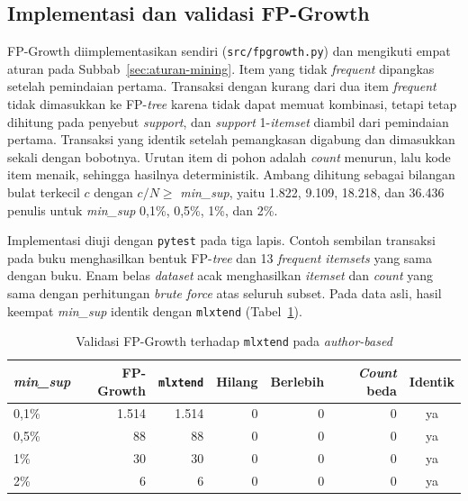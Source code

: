 
\subsection{Implementasi dan validasi FP-Growth}
\label{sec:hasil-t4-fp-validasi}
FP-Growth diimplementasikan sendiri (\texttt{src/fpgrowth.py}) dan mengikuti empat aturan pada Subbab~\ref{sec:aturan-mining}. Item yang tidak \textit{frequent} dipangkas setelah pemindaian pertama. Transaksi dengan kurang dari dua item \textit{frequent} tidak dimasukkan ke FP-\textit{tree} karena tidak dapat memuat kombinasi, tetapi tetap dihitung pada penyebut \textit{support}, dan \textit{support} 1-\textit{itemset} diambil dari pemindaian pertama. Transaksi yang identik setelah pemangkasan digabung dan dimasukkan sekali dengan bobotnya. Urutan item di pohon adalah \textit{count} menurun, lalu kode item menaik, sehingga hasilnya deterministik. Ambang dihitung sebagai bilangan bulat terkecil $c$ dengan $c/N \ge$ \textit{min\_sup}, yaitu 1.822, 9.109, 18.218, dan 36.436 penulis untuk \textit{min\_sup} 0,1\%, 0,5\%, 1\%, dan 2\%.

Implementasi diuji dengan \texttt{pytest} pada tiga lapis. Contoh sembilan transaksi pada buku \textcite{han2012} menghasilkan bentuk FP-\textit{tree} dan 13 \textit{frequent itemsets} yang sama dengan buku. Enam belas \textit{dataset} acak menghasilkan \textit{itemset} dan \textit{count} yang sama dengan perhitungan \textit{brute force} atas seluruh subset. Pada data asli, hasil keempat \textit{min\_sup} identik dengan \texttt{mlxtend} \cite{raschka2018} (Tabel~\ref{tab:t4-validasi}).

\begin{table}[ht]
\caption{Validasi FP-Growth terhadap \texttt{mlxtend} pada \textit{author-based}}
\label{tab:t4-validasi}
\small
\begin{tabular}{@{}lrrrrrc@{}}
\toprule
\textbf{\textit{min\_sup}} & \textbf{FP-Growth} & \textbf{\texttt{mlxtend}} & \textbf{Hilang} & \textbf{Berlebih} & \textbf{\textit{Count} beda} & \textbf{Identik} \\
\midrule
0,1\% & 1.514 & 1.514 & 0 & 0 & 0 & ya \\
0,5\% & 88 & 88 & 0 & 0 & 0 & ya \\
1\% & 30 & 30 & 0 & 0 & 0 & ya \\
2\% & 6 & 6 & 0 & 0 & 0 & ya \\
\bottomrule
\end{tabular}
\end{table}

